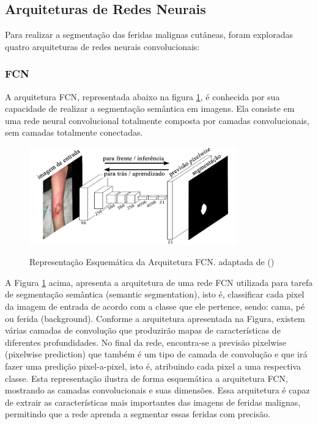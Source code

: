 \subsection{Arquiteturas de Redes Neurais}
    Para realizar a segmentação das feridas malignas cutâneas, foram exploradas quatro arquiteturas de redes neurais convolucionais:

    \subsubsection{FCN}
    
        A arquitetura \ac{FCN}, representada abaixo na figura \ref{fig:arquiteturaFCN},  é conhecida por sua capacidade de realizar a segmentação semântica em imagens. Ela consiste em uma rede neural convolucional totalmente composta por camadas convolucionais, sem camadas totalmente conectadas.

        \begin{figure}[htbp]
            \centering
            \caption{Representação Esquemática da Arquitetura \ac{FCN}. adaptada de (\cite{long2015fully})}
            \includegraphics[width=0.8\textwidth]{img/arquitetura_FCN.png}
            \label{fig:arquiteturaFCN}
        \end{figure}

            A Figura \ref{fig:arquiteturaFCN} acima, apresenta a arquitetura de uma rede \ac{FCN} utilizada para tarefa de segmentação semântica (semantic segmentation), isto é, classificar cada pixel da imagem de entrada de acordo com a classe que ele pertence, sendo: cama, pé ou ferida (background). Conforme a arquitetura apresentada na Figura, existem várias camadas de convolução que produzirão mapas de características de diferentes profundidades. No final da rede, encontra-se a previsão pixelwise (pixelwise prediction) que também é um tipo de camada de convolução e que irá fazer uma predição pixel-a-pixel, isto é, atribuindo cada pixel a uma respectiva classe. Esta representação ilustra de forma esquemática a arquitetura \ac{FCN}, mostrando as camadas convolucionais e suas dimensões. Essa arquitetura é capaz de extrair as características mais importantes das imagens de feridas malignas, permitindo que a rede aprenda a segmentar essas feridas com precisão. 

